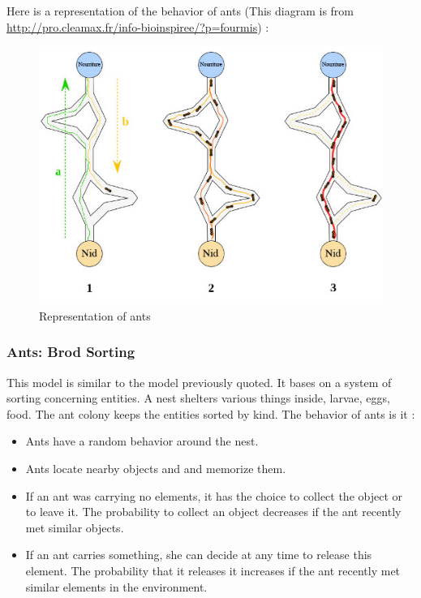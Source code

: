 Here is a representation of the behavior of ants (This diagram is from \url{http://pro.cleamax.fr/info-bioinspiree/?p=fourmis}) :

\begin{figure}[h]
\center
\includegraphics{../images/SchemaFourmi.png}
\caption{\label{AntsRepresentation}Representation of ants}
\end{figure}

\newpage
\subsubsection{Ants: Brod Sorting}

This model is similar to the model previously quoted. It bases on a system of sorting concerning entities. A nest shelters various things inside, larvae, eggs, food. The ant colony keeps the entities sorted by kind.
The behavior of ants is it :
\begin{itemize}
\item Ants have a random behavior around the nest.
\item Ants locate nearby objects and and memorize them.
\item If an ant was carrying no elements, it has the choice to collect the object or to leave it. The probability to collect an object decreases if the ant recently met similar objects.
\item If an ant carries something, she can decide at any time to release this element. The probability that it releases it increases if the ant recently met similar elements in the environment.
\end{itemize}

